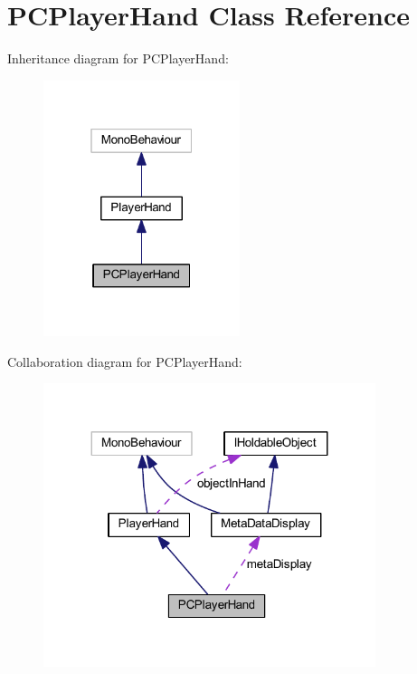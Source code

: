 \hypertarget{class_p_c_player_hand}{}\section{P\+C\+Player\+Hand Class Reference}
\label{class_p_c_player_hand}


Inheritance diagram for P\+C\+Player\+Hand\+:
\nopagebreak
\begin{figure}[H]
\begin{center}
\leavevmode
\includegraphics[width=163pt]{class_p_c_player_hand__inherit__graph}
\end{center}
\end{figure}


Collaboration diagram for P\+C\+Player\+Hand\+:
\nopagebreak
\begin{figure}[H]
\begin{center}
\leavevmode
\includegraphics[width=275pt]{class_p_c_player_hand__coll__graph}
\end{center}
\end{figure}

